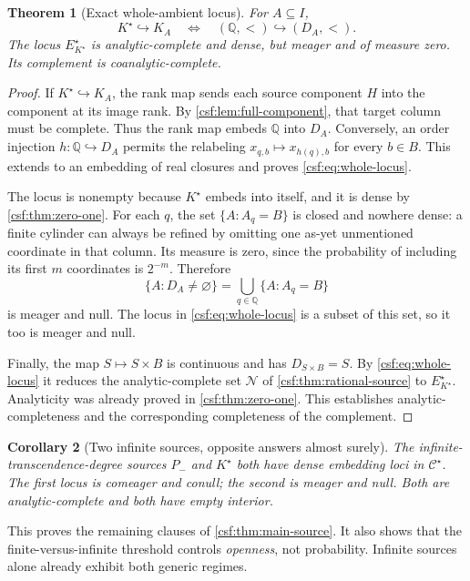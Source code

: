 \documentclass[11pt,a4paper]{article}
\numberwithin{equation}{section}
\newtheorem{theorem}{Theorem}[section]
\newtheorem{corollary}[theorem]{Corollary}
\theoremstyle{definition}
\theoremstyle{remark}
\newcommand{\Q}{\mathbb Q}
\newcommand{\emb}{\hookrightarrow}
\newcommand{\Cstar}{\mathcal C^{\star}}
\newcommand{\Kstar}{K^{\star}}
\begin{document}
\begin{theorem}[Exact whole-ambient locus]
\label{csf:thm:rare-ambient}
For $A\subseteq I$,
\begin{equation}
 \Kstar\emb K_A\quad\Longleftrightarrow\quad(\Q,<)\emb(D_A,<).
 \label{csf:eq:whole-locus}
\end{equation}
The locus $E^\star_{\Kstar}$ is analytic-complete and dense, but meager
and of measure zero. Its complement is coanalytic-complete.
\end{theorem}
\begin{proof}
If $\Kstar\emb K_A$, the rank map sends each source component $H$ into
the component at its image rank. By \cref{csf:lem:full-component}, that target
column must be complete. Thus the rank map embeds $\Q$ into $D_A$.
Conversely, an order injection $h:\Q\emb D_A$ permits the relabeling
$x_{q,b}\mapsto x_{h(q),b}$ for every $b\in B$. This extends to an embedding
of real closures and proves \eqref{csf:eq:whole-locus}.

The locus is nonempty because $\Kstar$ embeds into itself, and it is dense
by \cref{csf:thm:zero-one}. For each $q$, the set
$\{A:A_q=B\}$ is closed and nowhere dense: a finite cylinder can always
be refined by omitting one as-yet unmentioned coordinate in that column.
Its measure is zero, since the probability of including its first $m$
coordinates is $2^{-m}$. Therefore
\[
 \{A:D_A\ne\varnothing\}
   =\bigcup_{q\in\Q}\{A:A_q=B\}
\]
is meager and null. The locus in \eqref{csf:eq:whole-locus} is a subset of this
set, so it too is meager and null.

Finally, the map $S\mapsto S\times B$ is continuous and has
$D_{S\times B}=S$. By \eqref{csf:eq:whole-locus} it reduces the
analytic-complete set $\mathcal N$ of \cref{csf:thm:rational-source} to
$E^\star_{\Kstar}$. Analyticity was already proved in
\cref{csf:thm:zero-one}. This establishes analytic-completeness and the
corresponding completeness of the complement.
\end{proof}

\begin{corollary}[Two infinite sources, opposite answers almost surely]
The infinite-transcendence-degree sources $P_-$ and $\Kstar$ both have
dense embedding loci in $\Cstar$. The first locus is comeager and conull;
the second is meager and null. Both are analytic-complete and both have
empty interior.
\end{corollary}

This proves the remaining clauses of \cref{csf:thm:main-source}. It also shows
that the finite-versus-infinite threshold controls \emph{openness}, not
probability. Infinite sources alone already exhibit both generic regimes.
\end{document}
